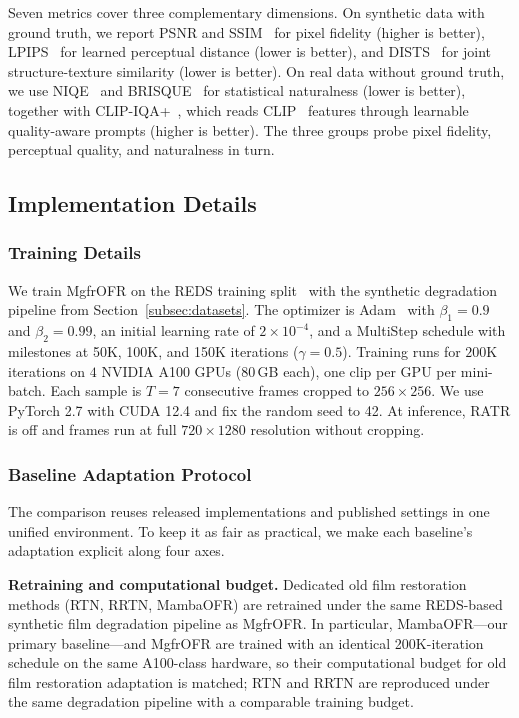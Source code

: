 Seven metrics cover three complementary dimensions. On synthetic data with ground truth, we report PSNR and SSIM~\cite{wang2004ssim} for pixel fidelity (higher is better), LPIPS~\cite{zhang2018lpips} for learned perceptual distance (lower is better), and DISTS~\cite{ding2020dists} for joint structure-texture similarity (lower is better). On real data without ground truth, we use NIQE~\cite{mittal2012niqe} and BRISQUE~\cite{mittal2012brisque} for statistical naturalness (lower is better), together with CLIP-IQA+~\cite{wang2023clipiqa}, which reads CLIP~\cite{radford2021clip} features through learnable quality-aware prompts (higher is better). The three groups probe pixel fidelity, perceptual quality, and naturalness in turn.

\subsection{Implementation Details}
\label{subsec:implementation}

\subsubsection{Training Details}
\label{subsubsec:training_details}

We train MgfrOFR on the REDS training split~\cite{nah2019reds} with the synthetic degradation pipeline from Section~\ref{subsec:datasets}. The optimizer is Adam~\cite{kingma2015adam} with $\beta_1=0.9$ and $\beta_2=0.99$, an initial learning rate of $2\times10^{-4}$, and a MultiStep schedule with milestones at 50K, 100K, and 150K iterations ($\gamma=0.5$). Training runs for $200$K iterations on $4$ NVIDIA A100 GPUs (80\,GB each), one clip per GPU per mini-batch. Each sample is $T=7$ consecutive frames cropped to $256\times256$. We use PyTorch 2.7 with CUDA 12.4 and fix the random seed to 42. At inference, RATR is off and frames run at full $720 \times 1280$ resolution without cropping.

\subsubsection{Baseline Adaptation Protocol}
\label{subsubsec:baseline_adaptation}

The comparison reuses released implementations and published settings in one unified environment. To keep it as fair as practical, we make each baseline's adaptation explicit along four axes.

\textbf{Retraining and computational budget.} Dedicated old film restoration methods (RTN, RRTN, MambaOFR) are retrained under the same REDS-based synthetic film degradation pipeline as MgfrOFR. In particular, MambaOFR---our primary baseline---and MgfrOFR are trained with an identical 200K-iteration schedule on the same A100-class hardware, so their computational budget for old film restoration adaptation is matched; RTN and RRTN are reproduced under the same degradation pipeline with a comparable training budget.

